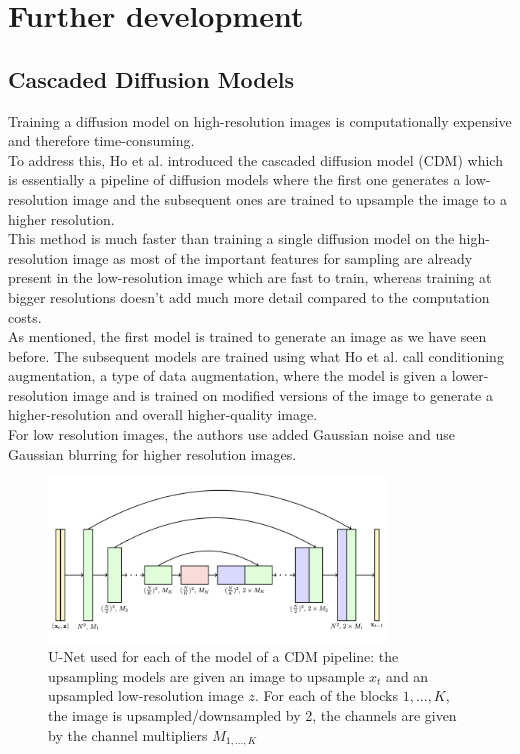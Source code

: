 \documentclass[twoside]{article}
\numberwithin{equation}{section}
\numberwithin{figure}{section}
\begin{document}
\section{Further development}

\subsection{Cascaded Diffusion Models}
Training a diffusion model on high-resolution images is computationally expensive and therefore time-consuming. \\
To address this, Ho et al. \cite{ho2021cascaded} introduced the cascaded diffusion model (CDM) which is essentially a pipeline of diffusion models where the first one generates a low-resolution image and the subsequent ones are trained to upsample the image to a higher resolution. \\
This method is much faster than training a single diffusion model on the high-resolution image as most of the important features for sampling are already present in the low-resolution image which are fast to train, whereas training at bigger resolutions doesn't add much more detail compared to the computation costs. \cite{ho2021cascaded}
\\
As mentioned, the first model is trained to generate an image as we have seen before. The subsequent models are trained using what Ho et al. call conditioning augmentation, a type of data augmentation, where the model is given a lower-resolution image and is trained on modified versions of the image to generate a higher-resolution and overall higher-quality image. \cite{ho2021cascaded} \\
For low resolution images, the authors use added Gaussian noise and use Gaussian blurring for higher resolution images. \cite{ho2021cascaded}
\begin{figure}[h]
  \begin{center}
    \includegraphics[width=0.8\textwidth]{images/cascadedUnet.png}
    \caption{U-Net used for each of the model of a CDM pipeline: the upsampling models are given an image to upsample $x_t$ and an upsampled low-resolution image $z$. For each of the blocks $1, ..., K$, the image is upsampled/downsampled by 2, the channels are given by the channel multipliers $M_{1, ..., K}$ \cite{ho2021cascaded}}
  \end{center}
\end{figure}
\end{document}
